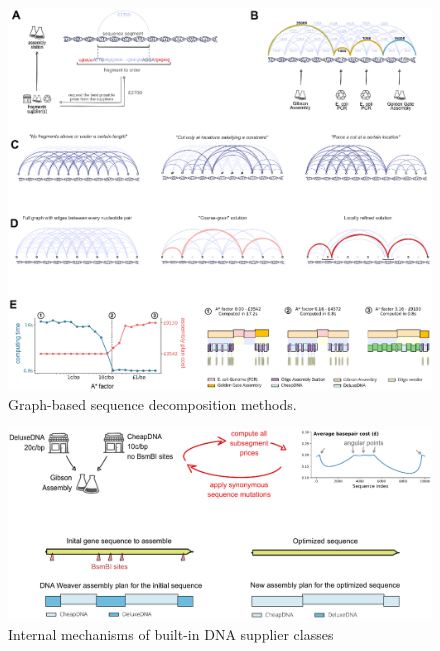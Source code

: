 \begin{figure}[!tpb]
  \includegraphics[width=\textwidth]{figures/figure_7_graph_algorithms.eps}
  \caption{Graph-based sequence decomposition methods.}
  \label{dna suppliers_internals}
\end{figure}

\begin{figure}[!tpb]
  \includegraphics[width=\textwidth]{figures/figure_8_manufacturability-optimization.eps}
  \caption{Internal mechanisms of built-in DNA supplier classes}
  \label{dna suppliers_internals}
\end{figure}